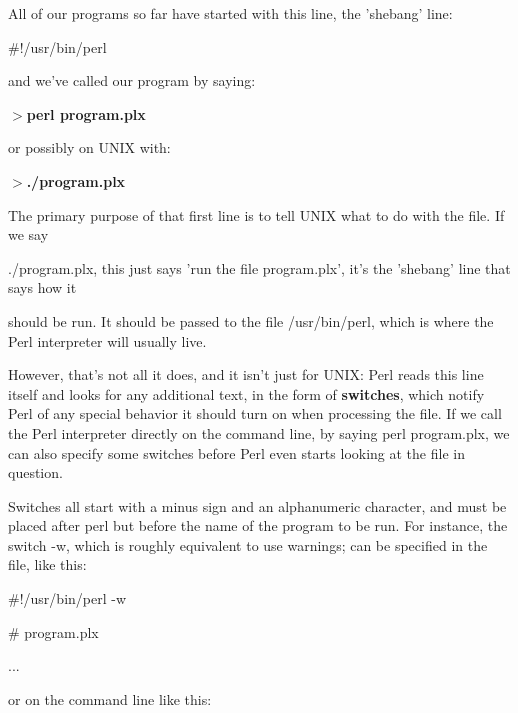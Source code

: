 \documentclass[a4paper,11pt]{book}
\begin{document}
\noindent All of our programs so far have started with this line, the 'shebang' line:

\noindent 

\noindent \#!/usr/bin/perl

\noindent 

\noindent and we've called our program by saying:

\noindent 

\noindent $>$\textbf{perl program.plx}

\noindent 

\noindent or possibly on UNIX with:

\noindent 

\noindent $>$\textbf{./program.plx}

\noindent 

\noindent The primary purpose of that first line is to tell UNIX what to do with the file. If we say

\noindent ./program.plx, this just says 'run the file program.plx', it's the 'shebang' line that says how it

\noindent should be run. It should be passed to the file /usr/bin/perl, which is where the Perl interpreter will usually live.

\noindent 

\noindent However, that's not all it does, and it isn't just for UNIX: Perl reads this line itself and looks for any additional text, in the form of \textbf{switches}, which notify Perl of any special behavior it should turn on when processing the file. If we call the Perl interpreter directly on the command line, by saying perl program.plx, we can also specify some switches before Perl even starts looking at the file in question.

\noindent 

\noindent Switches all start with a minus sign and an alphanumeric character, and must be placed after perl but before the name of the program to be run. For instance, the switch -w, which is roughly equivalent to use warnings; can be specified in the file, like this:

\noindent 

\noindent \#!/usr/bin/perl -w

\noindent \# program.plx

\noindent ...

\noindent 

\noindent 

\noindent or on the command line like this:
\end{document}
